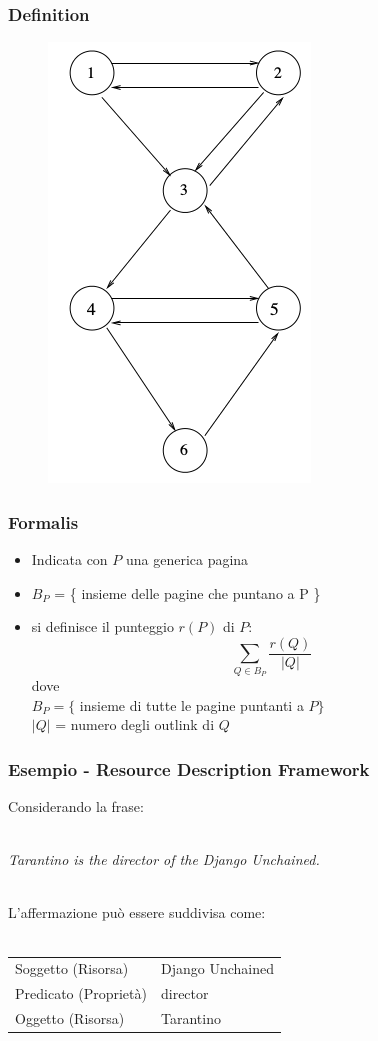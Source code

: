 \documentclass{beamer}
\begin{document}

\begin{frame}
\frametitle{Definition}
\begin{figure}
	\includegraphics[width=.3\textwidth]{figure/graph.png}
\end{figure}
\end{frame}


\begin{frame}
	\frametitle{Formalis}
	\begin{itemize}
		\item Indicata con $P$ una generica pagina
		\item $B_P$ = \{ insieme delle pagine che puntano a P \}
		\item si definisce il punteggio $r(P)$ di $P$: $$\sum_{Q \in B_P}\frac{r(Q)}{|Q|}$$ dove \\ $B_P=\{$ insieme di tutte le pagine puntanti a $P\}$ \\ $|Q|$ = numero degli outlink di $Q$
	\end{itemize}
\end{frame}


\begin{frame}
\end{frame}


\begin{frame}
\frametitle{Esempio - Resource Description Framework}
Considerando la frase:\\~\\
\begin{center} \emph{Tarantino is the director of the Django Unchained.} \\~\\
\end{center}
L'affermazione può essere suddivisa come: \\~\\
\begin{tabular}{ l | l }
 Soggetto (Risorsa) & Django Unchained \\
 Predicato (Proprietà) & director \\
 Oggetto (Risorsa) & Tarantino \\
\end{tabular}
\end{frame}
\end{document}
